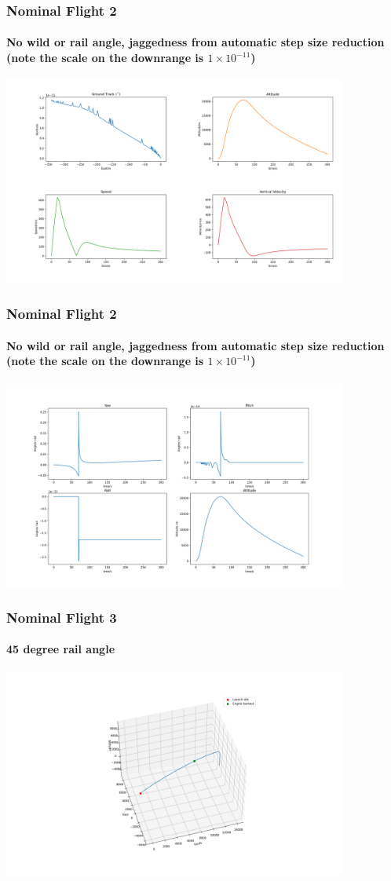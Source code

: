 \documentclass{beamer}
\begin{document}
    \begin{frame}
        \frametitle{Nominal Flight 2}
        \framesubtitle{No wild or rail angle, jaggedness from automatic step size reduction (note the scale on the downrange is $1\times10^{-11}$)}
        \includegraphics[width=0.85\textwidth]{images/example2a.png}
    \end{frame}
    \begin{frame}
        \frametitle{Nominal Flight 2}
        \framesubtitle{No wild or rail angle, jaggedness from automatic step size reduction (note the scale on the downrange is $1\times10^{-11}$)}
        \includegraphics[width=0.85\textwidth]{images/example3a.png}
    \end{frame}
    \begin{frame}
        \frametitle{Nominal Flight 3}
        \framesubtitle{45 degree rail angle}
        \includegraphics[width=0.85\textwidth]{images/example1b.png}
    \end{frame}
\end{document}
